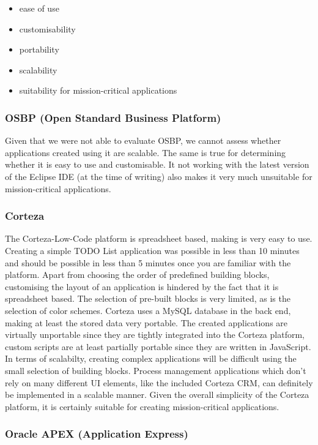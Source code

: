 \documentclass[runningheads]{llncs}
\begin{document}
\begin{itemize}
  \item ease of use
  \item customisability
  \item portability
  \item scalability
  \item suitability for mission-critical applications
\end{itemize}

\subsubsection{OSBP (Open Standard Business Platform)}

Given that we were not able to evaluate OSBP, we cannot assess whether applications created using it are scalable. The same is true for determining whether it is easy to use and customisable. It not working with the latest version of the Eclipse IDE (at the time of writing) also makes it very much unsuitable for mission-critical applications.

\subsubsection{Corteza}

The Corteza-Low-Code platform is spreadsheet based, making is very easy to use. Creating a simple TODO List application was possible in less than 10 minutes and should be possible in less than 5 minutes once you are familiar with the platform. Apart from choosing the order of predefined building blocks, customising the layout of an application is hindered by the fact that it is spreadsheet based. The selection of pre-built blocks is very limited, as is the selection of color schemes. Corteza uses a MySQL database in the back end, making at least the stored data very portable. The created applications are virtually unportable since they are tightly integrated into the Corteza platform, custom scripts are at least partially portable since they are written in JavaScript. In terms of scalabilty, creating complex applications will be difficult using the small selection of building blocks. Process management applications which don't rely on many different UI elements, like the included Corteza CRM, can definitely be implemented in a scalable manner. Given the overall simplicity of the Corteza platform, it is certainly suitable for creating mission-critical applications.

\subsubsection{Oracle APEX (Application Express)}
\end{document}

